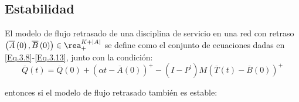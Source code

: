 \subsection{Estabilidad}

\begin{Def}
El modelo de flujo retrasado de una disciplina de servicio en una
red con retraso
$\left(\overline{A}\left(0\right),\overline{B}\left(0\right)\right)\in\rea_{+}^{K+|A|}$
se define como el conjunto de ecuaciones dadas en
\ref{Eq.3.8}-\ref{Eq.3.13}, junto con la condici\'on:
\begin{equation}\label{CondAd.FluidModel}
\overline{Q}\left(t\right)=\overline{Q}\left(0\right)+\left(\alpha
t-\overline{A}\left(0\right)\right)^{+}-\left(I-P^{'}\right)M\left(\overline{T}\left(t\right)-\overline{B}\left(0\right)\right)^{+}
\end{equation}
\end{Def}

entonces si el modelo de flujo retrasado tambi\'en es estable:


